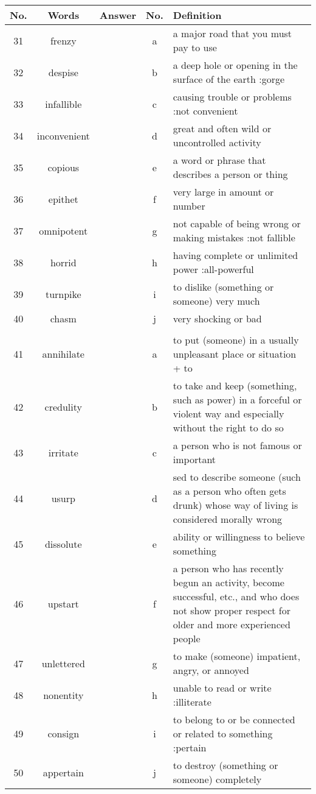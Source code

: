 \documentclass[a4paper]{article}
\begin{document}
\begin{center}
\begin{tabular}{|c|c|c|c|m{}|}
\hline
No. & Words & Answer & No. & Definition \\
\hline
 31 & frenzy & & a &  a major road that you must pay to use \\
\hline
 32 & despise & & b &  a deep hole or opening in the surface of the earth :gorge\\
\hline
 33 & infallible & & c &  causing trouble or problems :not convenient \\
\hline
 34 & inconvenient & & d &  great and often wild or uncontrolled activity \\
\hline
 35 & copious & & e &  a word or phrase that describes a person or thing \\
\hline
 36 & epithet & & f &  very large in amount or number \\
\hline
 37 & omnipotent & & g &  not capable of being wrong or making mistakes :not fallible \\
\hline
 38 & horrid & & h &  having complete or unlimited power :all-powerful \\
\hline
 39 & turnpike & & i &  to dislike (something or someone) very much \\
\hline
 40 & chasm & & j &  very shocking or bad \\
\hline
 & & & & \\
\hline
 41 & annihilate & & a &  to put (someone) in a usually unpleasant place or situation + to \\
\hline
 42 & credulity & & b &  to take and keep (something, such as power) in a forceful or violent way and especially without the right to do so \\
\hline
 43 & irritate & & c &  a person who is not famous or important \\
\hline
 44 & usurp & & d &  sed to describe someone (such as a person who often gets drunk) whose way of living is considered morally wrong \\
\hline
 45 & dissolute & & e &  ability or willingness to believe something \\
\hline
 46 & upstart & & f &  a person who has recently begun an activity, become successful, etc., and who does not show proper respect for older and more experienced people \\
\hline
 47 & unlettered & & g &  to make (someone) impatient, angry, or annoyed \\
\hline
 48 & nonentity & & h &  unable to read or write :illiterate \\
\hline
 49 & consign & & i &  to belong to or be connected or related to something :pertain \\
\hline
 50 & appertain & & j &  to destroy (something or someone) completely \\
\end{tabular}
\end{center}
\end{document}
